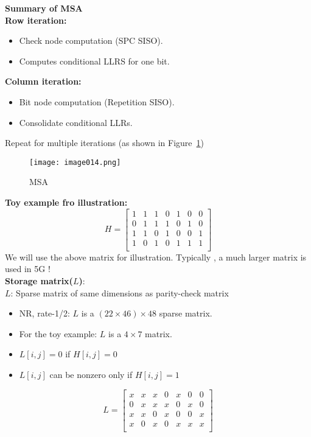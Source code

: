 \textbf{Summary of MSA} \\
\textbf{Row iteration:} \\
\begin{itemize}
    \item Check node computation (SPC SISO).
    \item Computes conditional LLRS for one bit.
\end{itemize}
\textbf{Column iteration:} \\
\begin{itemize}
    \item Bit node computation (Repetition SISO).
    \item Consolidate conditional LLRs.
\end{itemize}
Repeat for multiple iterations (as shown in Figure~\ref{fig:MSA})
\begin{figure}[ht]
    \centering
    \texttt{[image: image014.png]}
    \caption{MSA}
    \label{fig:MSA}
\end{figure}
\textbf{Toy example fro illustration:}\\
\[ H=\left[\begin{matrix}1&1&1&0&1&0&0\\0&1&1&1&0&1&0\\1&1&0&1&0&0&1\\1&0&1&0&1&1&1\\\end{matrix}\right] \]
We will use the above matrix for illustration. Typically , a much larger matrix is used in 5G !\\
\textbf{Storage matrix($L$)}:\\
$L$: Sparse matrix of same dimensions as parity-check matrix
\begin{itemize}
    \item NR, rate-1/2: $L$ is a $(22 \times 46) \times 48$ sparse matrix.
    \item For the toy example: $L$ is a $4 \times 7$ matrix.
    \item $L[i , j] = 0$ if $H[i , j] = 0$
    \item $L[i , j]$ can be nonzero only if $H[i , j] = 1$
\end{itemize}
\[ L=\left[\begin{matrix}x&x&x&0&x&0&0\\0&x&x&x&0&x&0\\x&x&0&x&0&0&x\\x&0&x&0&x&x&x\\\end{matrix}\right] \]
